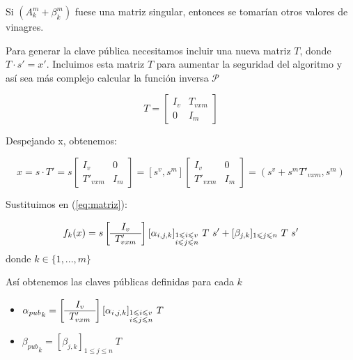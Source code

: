 Si $(A_k^m + \beta_k^m)$ fuese una matriz singular, entonces se tomarían otros valores de vinagres.


Para generar la clave pública necesitamos incluir una nueva matriz $T$, donde $T \cdot s' = x'$. Incluimos esta matriz $T$ para aumentar la seguridad del algoritmo y así sea más complejo calcular la función inversa $\mathcal{P}$

\begin{equation}
	T =
	\left[
	\begin{array}{c|c}
	I_v & T_{vxm} \\
	\hline
	0 & I_m
	\end{array}
	\right]
	\label{mat:T}
\end{equation}

Despejando x, obtenemos:

\begin{equation}\label{eq:def-x}
	x =  s \cdot T' = s  \left[
	\begin{array}{c|c}
	I_v & 0 \\
	\hline
	T'_{v x m} & I_m
	\end{array}
	\right]
	= [s^v, s^m] \left[
	\begin{array}{c|c}
	I_v & 0 \\
	\hline
	T'_{v x m} & I_m
	\end{array}
	\right]
	= (s^v + s^m T'_{vxm}, s^m )
\end{equation}

Sustituimos en (\ref{eq:matriz}):

\begin{equation}
	f_k(x) = s  \left[
	\begin{array}{c}
	I_v \\
	\hline
	T'_{v x m}
	\end{array}
	\right] [\alpha_{i,j,k}]_{\begin{subarray}{l}{1\leqslant i \leqslant v }\\ {i \leqslant j \leqslant n}\end{subarray}}\ T \ s' + [\beta_{j,k}]_{1\leqslant j\leqslant n}\ T\ s'
\end{equation}
donde $k \in \{1,...,m\}$

Así obtenemos las claves públicas definidas para cada $k$

\begin{itemize}
	\item ${\alpha_{pub}}_k = \left[
	\begin{array}{c}
	I_v \\
	\hline
	T'_{v x m}
	\end{array}
	\right] [\alpha_{i,j,k}]_{\begin{subarray}{l}{1 \leqslant i\leqslant v }\\ {i\leqslant j \leqslant n}\end{subarray}} \ T$
	
	\item ${\beta_{pub}}_k = [\beta_{j,k}]_{1\leqslant j\leqslant n}\ T$

\end{itemize}


